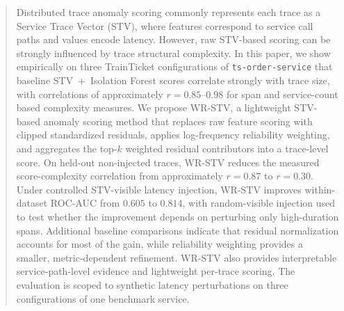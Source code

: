 \begin{abstract}
Distributed trace anomaly scoring commonly represents each trace as a
Service Trace Vector (STV), where features correspond to service call
paths and values encode latency. However, raw STV-based scoring can be
strongly influenced by trace structural complexity. In this paper, we
show empirically on three TrainTicket configurations of
\texttt{ts-order-service} that baseline STV~+~Isolation Forest scores
correlate strongly with trace size, with correlations of approximately
\(r=0.85\)--\(0.98\) for span and service-count based complexity
measures. We propose WR-STV, a lightweight STV-based anomaly scoring
method that replaces raw feature scoring with clipped standardized
residuals, applies log-frequency reliability weighting, and aggregates
the top-\(k\) weighted residual contributors into a trace-level score.
On held-out non-injected traces, WR-STV reduces the measured
score-complexity correlation from approximately \(r=0.87\) to
\(r=0.30\). Under controlled STV-visible latency injection, WR-STV
improves within-dataset ROC-AUC from \(0.605\) to \(0.814\), with
random-visible injection used to test whether the improvement depends
on perturbing only high-duration spans. Additional baseline comparisons
indicate that residual normalization accounts for most of the gain,
while reliability weighting provides a smaller, metric-dependent
refinement. WR-STV also provides interpretable service-path-level
evidence and lightweight per-trace scoring. The evaluation is scoped to
synthetic latency perturbations on three configurations of one
benchmark service.
\end{abstract}